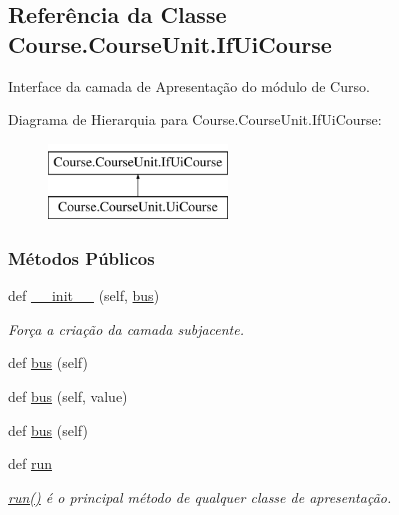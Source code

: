 \hypertarget{classCourse_1_1CourseUnit_1_1IfUiCourse}{}\subsection{Referência da Classe Course.\+Course\+Unit.\+If\+Ui\+Course}
\label{classCourse_1_1CourseUnit_1_1IfUiCourse}


Interface da camada de Apresentação do módulo de Curso.  


Diagrama de Hierarquia para Course.\+Course\+Unit.\+If\+Ui\+Course\+:\begin{figure}[H]
\begin{center}
\leavevmode
\includegraphics[height=2.000000cm]{d6/d82/classCourse_1_1CourseUnit_1_1IfUiCourse}
\end{center}
\end{figure}
\subsubsection*{Métodos Públicos}
\begin{DoxyCompactItemize}
\item 
def \hyperlink{classCourse_1_1CourseUnit_1_1IfUiCourse_a78517986cfd5598ae312624ec252d2cd}{\+\_\+\+\_\+init\+\_\+\+\_\+} (self, \hyperlink{classCourse_1_1CourseUnit_1_1IfUiCourse_a228fc709b99da3a7e6f5020bd07cee03}{bus})
\begin{DoxyCompactList}\small\item\em Força a criação da camada subjacente. \end{DoxyCompactList}\item 
def \hyperlink{classCourse_1_1CourseUnit_1_1IfUiCourse_af9f448bf861939bd039faed2f82de324}{bus} (self)
\item 
def \hyperlink{classCourse_1_1CourseUnit_1_1IfUiCourse_aef77e4a900a9eb4e1927ae8de1c439f7}{bus} (self, value)
\item 
def \hyperlink{classCourse_1_1CourseUnit_1_1IfUiCourse_af9f448bf861939bd039faed2f82de324}{bus} (self)
\item 
def \hyperlink{classCourse_1_1CourseUnit_1_1IfUiCourse_a5b174a0ca1e8fec0bb322d518c6b9cbe}{run}
\begin{DoxyCompactList}\small\item\em \hyperlink{classCourse_1_1CourseUnit_1_1IfUiCourse_a5b174a0ca1e8fec0bb322d518c6b9cbe}{run()} é o principal método de qualquer classe de apresentação. \end{DoxyCompactList}\end{DoxyCompactItemize}
